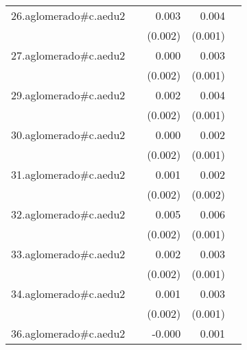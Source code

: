 {\begin{longtable}{l*{4}{D{.}{.}{-1}}}
\addlinespace
26.aglomerado#c.aedu2&                     &       0.003         &       0.004\sym{**} &                     \\
            &                     &     (0.002)         &     (0.001)         &                     \\
\addlinespace
27.aglomerado#c.aedu2&                     &       0.000         &       0.003         &                     \\
            &                     &     (0.002)         &     (0.001)         &                     \\
\addlinespace
29.aglomerado#c.aedu2&                     &       0.002         &       0.004\sym{***}&                     \\
            &                     &     (0.002)         &     (0.001)         &                     \\
\addlinespace
30.aglomerado#c.aedu2&                     &       0.000         &       0.002         &                     \\
            &                     &     (0.002)         &     (0.001)         &                     \\
\addlinespace
31.aglomerado#c.aedu2&                     &       0.001         &       0.002         &                     \\
            &                     &     (0.002)         &     (0.002)         &                     \\
\addlinespace
32.aglomerado#c.aedu2&                     &       0.005\sym{**} &       0.006\sym{***}&                     \\
            &                     &     (0.002)         &     (0.001)         &                     \\
\addlinespace
33.aglomerado#c.aedu2&                     &       0.002         &       0.003\sym{***}&                     \\
            &                     &     (0.002)         &     (0.001)         &                     \\
\addlinespace
34.aglomerado#c.aedu2&                     &       0.001         &       0.003\sym{*}  &                     \\
            &                     &     (0.002)         &     (0.001)         &                     \\
\addlinespace
36.aglomerado#c.aedu2&                     &      -0.000         &       0.001         &                     \\

\end{longtable}}
